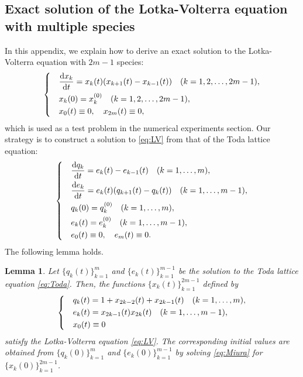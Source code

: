 \documentclass[pdflatex,sn-mathphys-num]{sn-jnl}%
\newcommand{\q}{\quad}
\theoremstyle{thmstyleone}%
\theoremstyle{thmstyletwo}%
\newtheorem{lemma}{Lemma}%
\theoremstyle{thmstylethree}%
\begin{document}
\begin{appendices}
\section{Exact solution of the Lotka-Volterra equation with multiple species}
\label{derivation}
In this appendix, we explain how to derive an exact solution to the Lotka-Volterra equation with $2m-1$ species:
\begin{align}
\begin{dcases}
& \frac{{\rm d}x_k}{{\rm d}t}=x_k(t)( x_{k+1}(t)-x_{k-1}(t)) \q (k=1, 2, \ldots, 2m-1), \\
& x_k(0)=x_k^{(0)} \q (k=1, 2, \ldots, 2m-1), \\
& x_0(t)\equiv 0, \q x_{2m}(t)\equiv 0,
\end{dcases}
\label{eq:LV}
\end{align}
which is used as a test problem in the numerical experiments section. Our strategy is to construct a solution to \eqref{eq:LV} from that of the Toda lattice equation:
\begin{align}
\begin{dcases}
& \frac{{\rm d}q_k}{{\rm d}t} = e_k(t)-e_{k-1}(t) \q (k=1, \ldots, m), \\
& \frac{{\rm d}e_k}{{\rm d}t} = e_k(t)(q_{k+1}(t)-q_k(t)) \q (k=1, \ldots, m-1), \\
& q_k(0)=q_k^{(0)} \q (k=1, \ldots, m), \\
& e_k(t)=e_k^{(0)} \q (k=1, \ldots, m-1), \\
& e_0(t)\equiv 0, \q e_m(t)\equiv 0.
\end{dcases}
\label{eq:Toda}
\end{align}
The following lemma holds.
\begin{lemma}
\label{LemB-1}
Let $\{q_k(t)\}_{k=1}^m$ and $\{e_k(t)\}_{k=1}^{m-1}$ be the solution to the Toda lattice equation \eqref{eq:Toda}. Then, the functions $\{x_k(t)\}_{k=1}^{2m-1}$ defined by
\begin{equation}
\begin{dcases}
& q_k(t)=1+x_{2k-2}(t)+x_{2k-1}(t) \q (k=1, \ldots, m), \\
& e_k(t)=x_{2k-1}(t)x_{2k}(t) \q (k=1, \ldots, m-1), \\
& x_0(t)\equiv 0
\end{dcases}
\label{eq:Miura}
\end{equation}
satisfy the Lotka-Volterra equation \eqref{eq:LV}. The corresponding initial values are obtained from $\{q_k(0)\}_{k=1}^m$ and $\{e_k(0)\}_{k=1}^{m-1}$ by solving \eqref{eq:Miura} for $\{x_k(0)\}_{k=1}^{2m-1}$.
\end{lemma}


\end{appendices}
\end{document}

